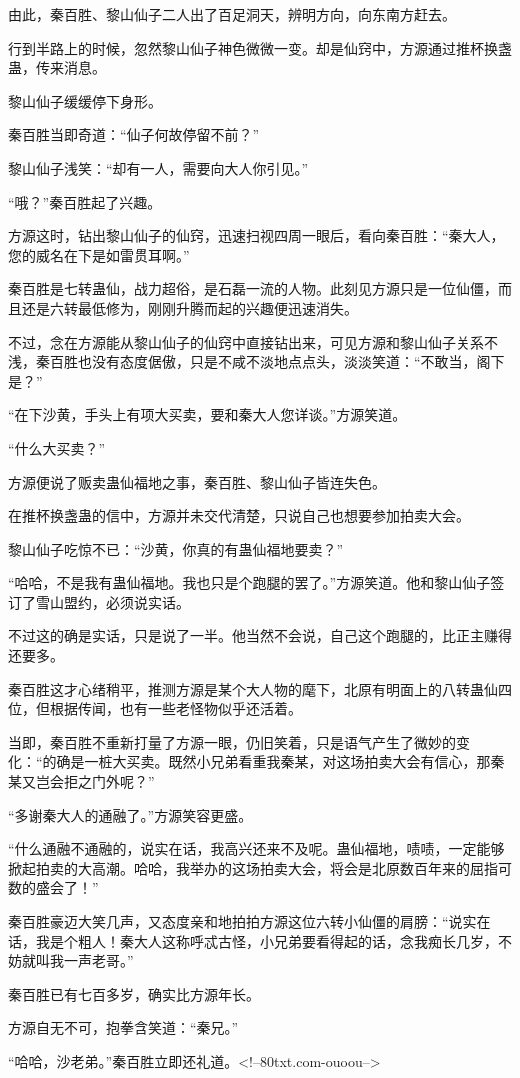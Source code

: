 \begin{this_body}
由此，秦百胜、黎山仙子二人出了百足洞天，辨明方向，向东南方赶去。

行到半路上的时候，忽然黎山仙子神色微微一变。却是仙窍中，方源通过推杯换盏蛊，传来消息。

黎山仙子缓缓停下身形。

秦百胜当即奇道：“仙子何故停留不前？”

黎山仙子浅笑：“却有一人，需要向大人你引见。”

“哦？”秦百胜起了兴趣。

方源这时，钻出黎山仙子的仙窍，迅速扫视四周一眼后，看向秦百胜：“秦大人，您的威名在下是如雷贯耳啊。”

秦百胜是七转蛊仙，战力超俗，是石磊一流的人物。此刻见方源只是一位仙僵，而且还是六转最低修为，刚刚升腾而起的兴趣便迅速消失。

不过，念在方源能从黎山仙子的仙窍中直接钻出来，可见方源和黎山仙子关系不浅，秦百胜也没有态度倨傲，只是不咸不淡地点点头，淡淡笑道：“不敢当，阁下是？”

“在下沙黄，手头上有项大买卖，要和秦大人您详谈。”方源笑道。

“什么大买卖？”

方源便说了贩卖蛊仙福地之事，秦百胜、黎山仙子皆连失色。

在推杯换盏蛊的信中，方源并未交代清楚，只说自己也想要参加拍卖大会。

黎山仙子吃惊不已：“沙黄，你真的有蛊仙福地要卖？”

“哈哈，不是我有蛊仙福地。我也只是个跑腿的罢了。”方源笑道。他和黎山仙子签订了雪山盟约，必须说实话。

不过这的确是实话，只是说了一半。他当然不会说，自己这个跑腿的，比正主赚得还要多。

秦百胜这才心绪稍平，推测方源是某个大人物的麾下，北原有明面上的八转蛊仙四位，但根据传闻，也有一些老怪物似乎还活着。

当即，秦百胜不重新打量了方源一眼，仍旧笑着，只是语气产生了微妙的变化：“的确是一桩大买卖。既然小兄弟看重我秦某，对这场拍卖大会有信心，那秦某又岂会拒之门外呢？”

“多谢秦大人的通融了。”方源笑容更盛。

“什么通融不通融的，说实在话，我高兴还来不及呢。蛊仙福地，啧啧，一定能够掀起拍卖的大高潮。哈哈，我举办的这场拍卖大会，将会是北原数百年来的屈指可数的盛会了！”

秦百胜豪迈大笑几声，又态度亲和地拍拍方源这位六转小仙僵的肩膀：“说实在话，我是个粗人！秦大人这称呼忒古怪，小兄弟要看得起的话，念我痴长几岁，不妨就叫我一声老哥。”

秦百胜已有七百多岁，确实比方源年长。

方源自无不可，抱拳含笑道：“秦兄。”

“哈哈，沙老弟。”秦百胜立即还礼道。<!--80txt.com-ouoou-->

\end{this_body}

